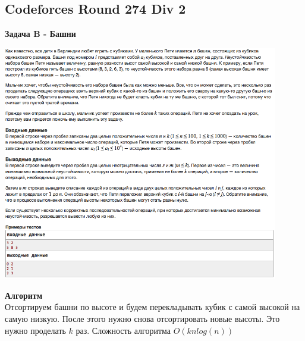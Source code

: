 \documentclass[a4paper,12pt]{article}
\begin{document}
%
%

\newpage
\subsection{Codeforces Round 274 Div 2}

\textbf{{\large Задача B - Башни}} \\
\begin{center}
\includegraphics[width=0.9\textwidth]{C_274/C_274_B.png}\\ [1cm]
\end{center}
\textbf{{\large Алгоритм}} \\
Отсортируем башни по высоте и будем перекладывать кубик с самой высокой на самую низкую. После этого нужно снова отсортировать новые высоты. Это нужно проделать $k$ раз. Сложность алгоритма $O(knlog(n))$\\
\end{document}
